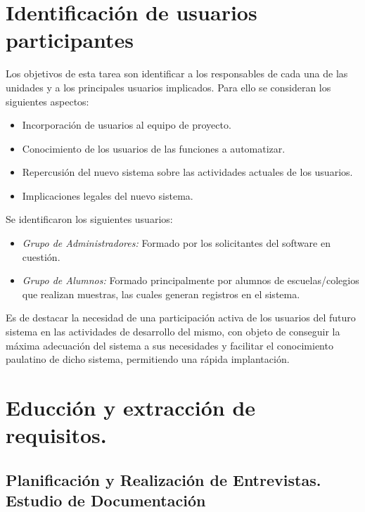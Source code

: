 \section{Identificación de usuarios participantes}

Los objetivos de esta tarea son identificar a los responsables de cada una de las unidades y a los principales usuarios implicados. Para ello se consideran los siguientes aspectos:

\begin{itemize}
    \item Incorporación de usuarios al equipo de proyecto.
    \item Conocimiento de los usuarios de las funciones a automatizar.
    \item Repercusión del nuevo sistema sobre las actividades actuales de los usuarios.
    \item Implicaciones legales del nuevo sistema.
 
\end{itemize}

Se identificaron los siguientes usuarios:

 \begin{itemize}
 
\item \emph{Grupo de Administradores:} Formado por los solicitantes del software en cuestión.
 
\item \emph{Grupo de Alumnos:} Formado principalmente por alumnos de escuelas/colegios que realizan muestras, las cuales generan registros en el sistema.

 \end{itemize}
 
 Es de destacar la necesidad de una participación activa de los usuarios del futuro sistema en las actividades de desarrollo del mismo, con objeto de conseguir la máxima adecuación del sistema a sus necesidades y facilitar el conocimiento paulatino de dicho sistema, permitiendo una rápida implantación.

  \section{Educción y extracción de requisitos.}

  \subsection{Planificación y Realización de Entrevistas. Estudio de Documentación}
  
